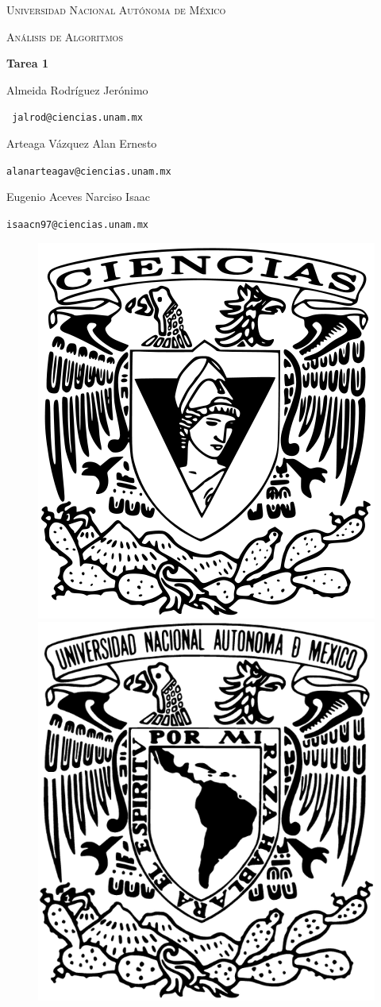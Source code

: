 \documentclass[a4paper, 12pt]{report}
\begin{document}
\begin{titlepage}
    \centering
    {\scshape\Huge Universidad Nacional Autónoma de México \par}
    \vspace{1.5cm}
    {\scshape\huge Análisis de Algoritmos\par}
    \vspace{1.25cm}
    {\huge\bfseries Tarea 1\par}
    \vspace{1.5cm}
    {\Large\textsc Almeida Rodríguez Jerónimo\par}
    \vspace{.1cm}
    {\large\texttt{ jalrod@ciencias.unam.mx}\par}
    \vspace{0.5cm}
    {\Large\textsc Arteaga Vázquez Alan Ernesto\par}
    \vspace{.1cm}
    {\large\texttt{alanarteagav@ciencias.unam.mx}\par}
    \vspace{0.5cm}
    {\Large\textsc Eugenio Aceves Narciso Isaac \par}
    \vspace{.1cm}
    {\large\texttt{isaacn97@ciencias.unam.mx}\par}
    \vspace{2cm}
    \vfill
    \begin{figure}[hb!]
        \includegraphics[width=.3\textwidth]
            {logos/escudo_f-ciencias.png}\hfill
        \includegraphics[width=.3\textwidth]
            {logos/Escudo_UNAM.png}\hfill
    \end{figure}
\end{titlepage}
\end{document}
